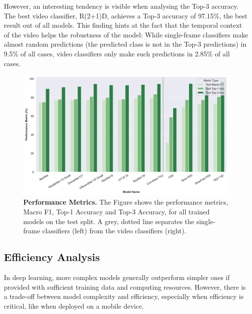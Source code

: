 \documentclass[a4paper]{article}
\begin{document}
However, an interesting tendency is visible when analysing the Top-3 accuracy.
The best video classifier, R(2+1)D, achieves a Top-3 accuracy of 97.15\%, the
best result out of all models. This finding hints at the fact that the temporal
context of the video helps the robustness of the model: While single-frame
classifiers make almost random predictions (the predicted class is not in the
Top-3 predictions) in 9.5\% of all cases, video classifiers only make such
predictions in 2.85\% of all cases.



\begin{figure}
  \begin{center}
    \includegraphics[width=.8\textwidth]
    {./figures/performance-metrics.png}
  \end{center}

  \caption{\textbf{Performance Metrics.} The Figure shows the performance
  metrics, Macro F1, Top-1 Accuracy and Top-3 Accuracy, for all trained models
on the test split. A grey, dotted line separates the single-frame classifiers
(left) from the video classifiers (right).}

  \label{fig:performance-metrics}
\end{figure}

\subsection{Efficiency Analysis} %
\label{sub:efficiency}

In deep learning, more complex models generally outperform simpler ones if
provided with sufficient training data and computing resources. However, there
is a trade-off between model complexity and efficiency, especially when
efficiency is critical, like when deployed on a mobile device.
\end{document}
